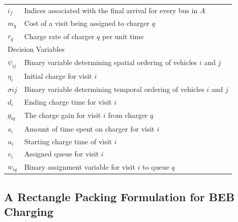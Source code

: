 \documentclass[ee,msthesis]{usuthesis}
\begin{document}
\begin{table}[!htpb]
\begin{tabularx}{\textwidth}{l l}
    $i_f$ & Indices associated with the final arrival for every bus in $A$                                                 \\
    $m_q$ & Cost of a visit being assigned to charger $q$                                                                  \\
    $r_q$ & Charge rate of charger $q$ per unit time                                                                       \\
    \hline
    \multicolumn{2}{l}{Decision Variables}                                                                                 \\
    $\psi_{ij}$ & Binary variable determining spatial ordering of vehicles $i$ and $j$                                       \\
    $\eta_i$    & Initial charge for visit $i$                                                                                \\
    $\sigma{ij}$ & Binary variable determining temporal ordering of vehicles $i$ and $j$                                       \\
    $d_i$    & Ending charge time for visit $i$                                                                            \\
    $g_{iq}$ & The charge gain for visit $i$ from charger $q$                                                              \\
    $s_i$    & Amount of time spent on charger for visit $i$                                                               \\
    $u_i$    & Starting charge time of visit $i$                                                                           \\
    $v_i$    & Assigned queue for visit $i$                                                                                \\
    $w_{iq}$ & Binary assignment variable for visit $i$ to queue $q$                                                       \\
    \bottomrule
  \end{tabularx}
\end{table}

\subsection{A Rectangle Packing Formulation for BEB Charging}
\label{sec:problemformulation}
\end{document}
